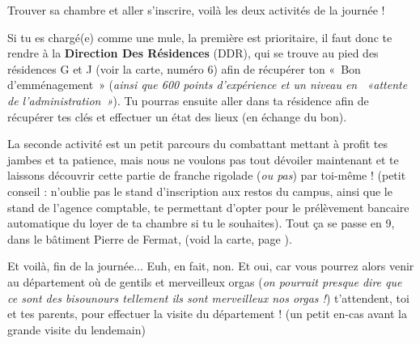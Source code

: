 Trouver sa chambre et aller s'inscrire, voilà les deux activités de la journée !

Si tu es chargé(e) comme une mule, la première est prioritaire, il faut donc te
rendre à la \textbf{Direction Des Résidences} (DDR), qui se trouve au pied des résidences
G et J (voir la carte, numéro 6) afin de récupérer ton «~Bon d'emménagement~» (\emph{ainsi que 600 points
d'expérience et un niveau en ~«attente de l'administration~»}).
Tu pourras ensuite aller dans ta résidence afin de récupérer tes
clés et effectuer un état des lieux (en échange du bon).

La seconde activité est un petit parcours du combattant mettant à profit tes 
jambes et ta patience, mais nous ne voulons pas tout dévoiler maintenant et
te laissons découvrir cette partie de franche rigolade (\emph{ou pas}) par toi-même !
(petit conseil : n'oublie pas le stand d'inscription aux restos du campus, ainsi que le
 stand de l'agence comptable, te permettant d'opter pour le prélèvement bancaire
 automatique du loyer de ta chambre si tu le souhaites). Tout ça se passe en 9,
dans le bâtiment Pierre de Fermat, (void la carte, page \pageref{plan}).

Et voilà, fin de la journée... Euh, en fait, non.
Et oui, car vous pourrez alors venir au département où de gentils et merveilleux
orgas (\emph{on pourrait presque dire que ce sont des bisounours tellement ils sont
merveilleux nos orgas !}) t'attendent, toi et tes parents, pour effectuer
la visite du département ! (un petit en-cas avant la grande visite du lendemain) 
